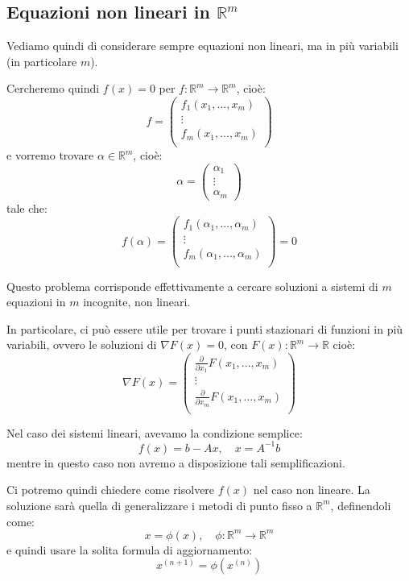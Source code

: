\documentclass[a4paper,11pt]{article}
\begin{document}
\subsection{Equazioni non lineari in $\mathbb{R}^m$}
Vediamo quindi di considerare sempre equazioni non lineari, ma in più variabili (in particolare $m$).

Cercheremo quindi $f(x) = 0$ per $f: \mathbb{R}^m \rightarrow \mathbb{R}^m$, cioè:
$$
f =
\begin{pmatrix}
	f_1 (x_1, ..., x_m) \\
	\vdots \\
	f_m (x_1, ..., x_m) \\
\end{pmatrix}
$$
e vorremo trovare $\alpha \in \mathbb{R}^m$, cioè:
$$
\alpha = 
\begin{pmatrix}
	\alpha_1 \\
	\vdots \\
	\alpha_m
\end{pmatrix}
$$
tale che:
$$
f(\alpha) = 
\begin{pmatrix}
	f_1 (\alpha_1, ..., \alpha_m) \\
	\vdots \\
	f_m (\alpha_1, ..., \alpha_m) \\
\end{pmatrix}
= 0
$$

Questo problema corrisponde effettivamente a cercare soluzioni a sistemi di $m$ equazioni in $m$ incognite, non lineari.

\par\smallskip

In particolare, ci può essere utile per trovare i punti stazionari di funzioni in più variabili, ovvero le soluzioni di $\nabla F(x) = 0$, con $F(x) : \mathbb{R}^m \rightarrow \mathbb{R}$ cioè:
$$
\nabla F(x) = 
\begin{pmatrix}
	\frac{\partial }{\partial x_1} F(x_1, ..., x_m) \\
	\vdots \\ 
	\frac{\partial }{\partial x_m} F(x_1, ..., x_m) \\
\end{pmatrix}
$$

\par\smallskip

Nel caso dei sistemi lineari, avevamo la condizione semplice:
$$
f(x) = b - Ax, \quad x = A^{-1} b
$$
mentre in questo caso non avremo a disposizione tali semplificazioni.

Ci potremo quindi chiedere come risolvere $f(x)$ nel caso non lineare.
La soluzione sarà quella di generalizzare i metodi di punto fisso a $\mathbb{R}^m$, definendoli come:
$$
x = \phi(x), \quad \phi : \mathbb{R}^m \rightarrow \mathbb{R}^m
$$
e quindi usare la solita formula di aggiornamento:
$$
x^{(n + 1)} = \phi(x^{(n)})
$$
\end{document}
